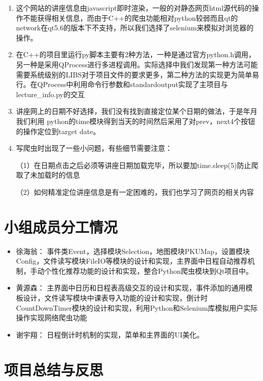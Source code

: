 \documentclass[11pt,hyperref,a4paper,UTF8]{ctexart}
\begin{document}
\begin{CJK}{UTF8}{gkai}
\begin{enumerate}
    \item 这个网站的讲座信息由javascript即时渲染，一般的对静态网页html源代码的操作不能获得相关信息，而由于C++的爬虫功能相对python较弱而且qt的network在qt5.6的版本下不支持，所以我们选择了selenium来模拟对浏览器的操作。
    \item 在C++的项目里运行py脚本主要有2种方法，一种是通过官方python.h调用，另一种是采用QProcess进行多进程调用。实际选择中我们发现第一种方法可能需要系统级别的LIBS对于项目文件的要求更多，第二种方法的实现更为简单易行。在QProcess中利用命令行参数和standardoutput实现了主项目与lecture\_info.py的交互
    \item 讲座网上的日期不好选择，我们没有找到直接定位某个日期的做法，于是年月我们利用 python的time模块得到当天的时间然后采用了对prev，next4个按钮的操作定位到target date。
    \item 写爬虫时出现了一些小问题，有些细节需要注意：

    （1）在日期点击之后必须等讲座日期加载完毕，所以要加time.sleep(5)防止爬取了未加载时的信息

    （2）如何精准定位讲座信息是有一定困难的，我们也学习了网页的相关内容
\end{enumerate}

\section{小组成员分工情况}
\begin{itemize}
    \item 徐海翁： 事件类Event，选择模块Selection，地图模块PKUMap，设置模块Config，文件读写模块FileIO等模块的设计和实现，主界面中日程自动推荐机制，手动个性化推荐功能的设计和实现，整合Python爬虫模块到Qt项目中。
    \item 黄源森： 主界面中日历和日程表高级交互的设计和实现，事件添加的通用模板设计，文件读写模块中课表导入功能的设计和实现，倒计时CountDownTimer模块的设计和实现，利用Python和Selenium库模拟用户实际操作实现网络爬虫功能
    \item 谢宇翔： 日程倒计时机制的实现，菜单和主界面的UI美化。
\end{itemize}

\section{项目总结与反思}


\end{CJK}
\end{document}
